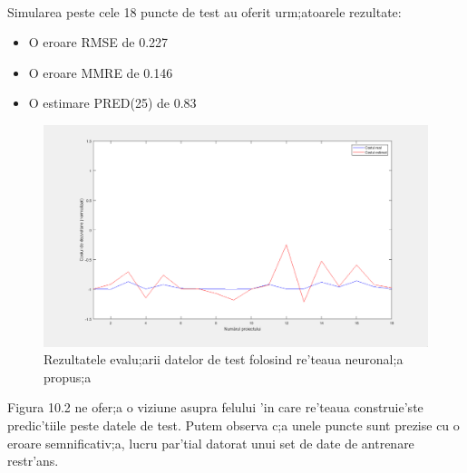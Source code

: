 \paragraph{}
Simularea peste cele 18 puncte de test au oferit urm;atoarele rezultate: 
\begin{itemize}
\item O eroare RMSE de 0.227
\item O eroare MMRE de 0.146
\item O estimare PRED(25) de 0.83
\end{itemize}
\par
\begin{figure}[!htbp]
\includegraphics[width=\textwidth]{nntestoutput}
\caption{Rezultatele evalu;arii datelor de test folosind re'teaua neuronal;a propus;a}
\end{figure}
\par
Figura 10.2 ne ofer;a o viziune asupra felului 'in care re'teaua construie'ste predic'tiile peste datele de test. Putem observa c;a unele puncte sunt prezise cu o eroare semnificativ;a, lucru par'tial datorat unui set de date de antrenare restr'ans.